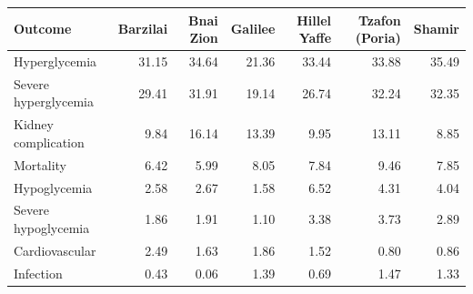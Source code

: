 \begin{tabular}{lrrrrrr}
\toprule
Outcome & Barzilai & Bnai Zion & Galilee & Hillel Yaffe & Tzafon (Poria) & Shamir \\
\midrule
Hyperglycemia & 31.15 & 34.64 & 21.36 & 33.44 & 33.88 & 35.49 \\
Severe hyperglycemia & 29.41 & 31.91 & 19.14 & 26.74 & 32.24 & 32.35 \\
Kidney complication & 9.84 & 16.14 & 13.39 & 9.95 & 13.11 & 8.85 \\
Mortality & 6.42 & 5.99 & 8.05 & 7.84 & 9.46 & 7.85 \\
Hypoglycemia & 2.58 & 2.67 & 1.58 & 6.52 & 4.31 & 4.04 \\
Severe hypoglycemia & 1.86 & 1.91 & 1.10 & 3.38 & 3.73 & 2.89 \\
Cardiovascular & 2.49 & 1.63 & 1.86 & 1.52 & 0.80 & 0.86 \\
Infection & 0.43 & 0.06 & 1.39 & 0.69 & 1.47 & 1.33 \\
\bottomrule
\end{tabular}
